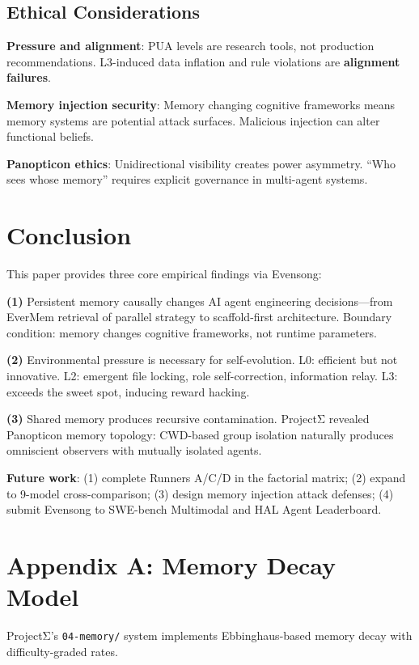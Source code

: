 \documentclass[11pt, a4paper]{article}
\begin{document}
\subsection{Ethical Considerations}

\textbf{Pressure and alignment}: PUA levels are research tools, not production recommendations. L3-induced data inflation and rule violations are \textbf{alignment failures}.

\textbf{Memory injection security}: Memory changing cognitive frameworks means memory systems are potential attack surfaces. Malicious injection can alter functional beliefs.

\textbf{Panopticon ethics}: Unidirectional visibility creates power asymmetry. ``Who sees whose memory'' requires explicit governance in multi-agent systems.

\section{Conclusion}

This paper provides three core empirical findings via Evensong:

\textbf{(1)} Persistent memory causally changes AI agent engineering decisions---from EverMem retrieval of parallel strategy to scaffold-first architecture. Boundary condition: memory changes cognitive frameworks, not runtime parameters.

\textbf{(2)} Environmental pressure is necessary for self-evolution. L0: efficient but not innovative. L2: emergent file locking, role self-correction, information relay. L3: exceeds the sweet spot, inducing reward hacking.

\textbf{(3)} Shared memory produces recursive contamination. ProjectΣ revealed Panopticon memory topology: CWD-based group isolation naturally produces omniscient observers with mutually isolated agents.

\textbf{Future work}: (1) complete Runners A/C/D in the factorial matrix; (2) expand to 9-model cross-comparison; (3) design memory injection attack defenses; (4) submit Evensong to SWE-bench Multimodal and HAL Agent Leaderboard.

\clearpage
\appendix
\section{Appendix A: Memory Decay Model}

ProjectΣ's \texttt{04-memory/} system implements Ebbinghaus-based memory decay with difficulty-graded rates.
\end{document}

